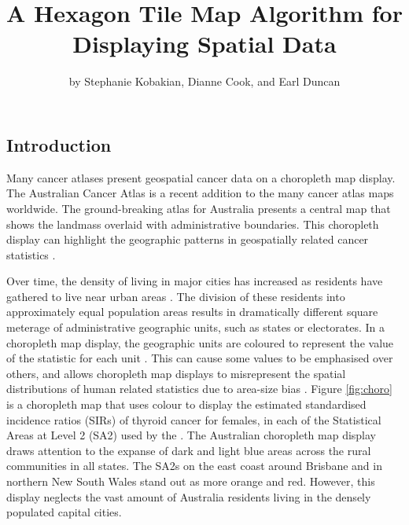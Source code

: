 \title{A Hexagon Tile Map Algorithm for Displaying Spatial Data}
\author{by Stephanie Kobakian, Dianne Cook, and Earl Duncan}

\maketitle


\hypertarget{introduction}{%
\subsection{Introduction}\label{introduction}}

Many cancer atlases present geospatial cancer data on a choropleth map
display. The Australian Cancer Atlas \citep{TACA} is a recent addition
to the many cancer atlas maps worldwide. The ground-breaking atlas for
Australia presents a central map that shows the landmass overlaid with
administrative boundaries. This choropleth display can highlight the
geographic patterns in geospatially related cancer statistics
\citep{SAMGIS}.

Over time, the density of living in major cities has increased as
residents have gathered to live near urban areas \citep{ACTUC}. The
division of these residents into approximately equal population areas
results in dramatically different square meterage of administrative
geographic units, such as states or electorates. In a choropleth map
display, the geographic units are coloured to represent the value of the
statistic for each unit \citep{EI}. This can cause some values to be
emphasised over others, and allows choropleth map displays to
misrepresent the spatial distributions of human related statistics due
to area-size bias \citep{BCM}. Figure \ref{fig:choro} is a choropleth
map that uses colour to display the estimated standardised incidence
ratios (SIRs) of thyroid cancer for females, in each of the Statistical
Areas at Level 2 (SA2) used by the \citet{abs2011}. The Australian
choropleth map display draws attention to the expanse of dark and light
blue areas across the rural communities in all states. The SA2s on the
east coast around Brisbane and in northern New South Wales stand out as
more orange and red. However, this display neglects the vast amount of
Australia residents living in the densely populated capital cities.

